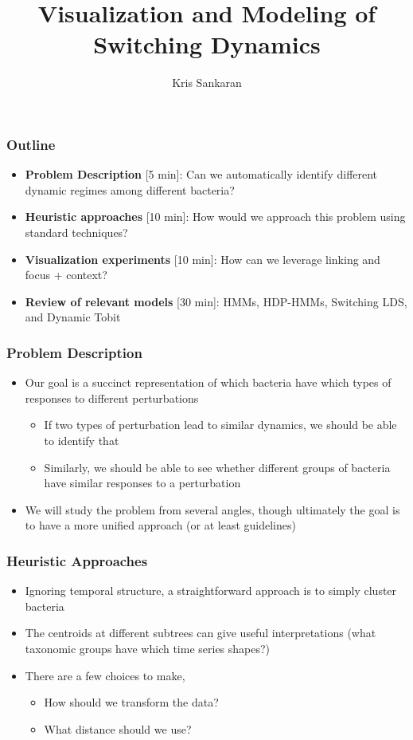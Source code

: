 \documentclass{beamer}
\title{Visualization and Modeling of Switching Dynamics}
\author{Kris Sankaran}
\begin{document}
\begin{frame}
  \titlepage
\end{frame}

\begin{frame}
  \frametitle{Outline}
\begin{itemize}
\item \textbf{Problem Description} [5 min]: Can we automatically identify
  different dynamic regimes among different bacteria?
\item \textbf{Heuristic approaches} [10 min]: How would we approach this problem
  using standard techniques?
\item \textbf{Visualization experiments} [10 min]: How can we leverage linking
  and focus + context?
\item \textbf{Review of relevant models} [30 min]: HMMs, HDP-HMMs, Switching
  LDS, and Dynamic Tobit
\end{itemize}
\end{frame}

\begin{frame}
  \frametitle{Problem Description}
  \begin{itemize}
  \item Our goal is a succinct representation of which bacteria have which types
    of responses to different perturbations
    \begin{itemize}
    \item If two types of perturbation lead to similar dynamics, we should be able
      to identify that
    \item Similarly, we should be able to see whether different groups of bacteria
      have similar responses to a perturbation
    \end{itemize} 
  \item We will study the problem from several angles, though ultimately the
    goal is to have a more unified approach (or at least guidelines)
  \end{itemize}  
\end{frame}

\begin{frame}
  \frametitle{Heuristic Approaches} 
  \begin{itemize}
  \item Ignoring temporal structure, a straightforward approach is to simply
    cluster bacteria
  \item The centroids at different subtrees can give useful interpretations (what
    taxonomic groups have which time series shapes?)
  \item There are a few choices to make,
    \begin{itemize}
    \item How should we transform the data?
    \item What distance should we use?
    \end{itemize} 
  \end{itemize}
\end{frame}
\end{document}
